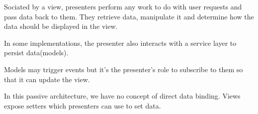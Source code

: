 \documentclass[a4paper, 11pt]{book}
\begin{document}
Sociated by a view, presenters perform any work to do with user requests and
pass data  back to them. They retrieve data, manipulate it and determine how the
data should be displayed in the view.

In some implementations, the presenter also interacts with a service layer to
persist data(models).

Models may trigger events but it's the presenter's role to subscribe to them so
that it can update the view. 

In this passive architecture, we have no concept of direct data binding. Views
expose setters which presenters can use to set data.
\end{document}
